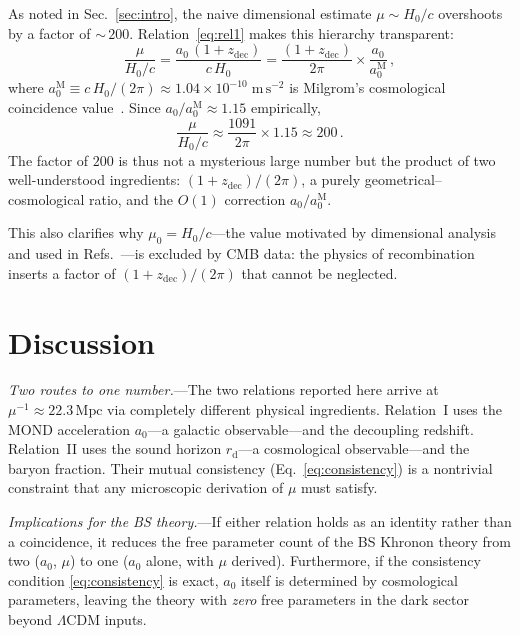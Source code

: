 \documentclass[prl,twocolumn,superscriptaddress,longbibliography]{revtex4-2}
\newcommand{\Mpc}{\,\mathrm{Mpc}}
\newcommand{\zdec}{z_{\mathrm{dec}}}
\newcommand{\rd}{r_{\mathrm{d}}}
\begin{document}
As noted in Sec.~\ref{sec:intro}, the naive dimensional
estimate $\mu \sim H_0/c$ overshoots by a factor
of ${\sim}\,200$.
Relation~\eqref{eq:rel1} makes this hierarchy transparent:
\begin{equation}
  \frac{\mu}{H_0/c}
  = \frac{a_0\,(1 + \zdec)}{c\, H_0}
  = \frac{(1 + \zdec)}{2\pi}
    \times \frac{a_0}{a_0^{\mathrm{M}}} \,,
  \label{eq:hierarchy}
\end{equation}
where $a_0^{\mathrm{M}} \equiv c\, H_0 / (2\pi)
\approx 1.04 \times 10^{-10}\;\mathrm{m\,s}^{-2}$ is
Milgrom's cosmological coincidence
value~\cite{Milgrom1983,Milgrom2020}.
Since $a_0 / a_0^{\mathrm{M}} \approx 1.15$ empirically,
\begin{equation}
  \frac{\mu}{H_0/c}
  \approx \frac{1091}{2\pi} \times 1.15
  \approx 200 \,.
  \label{eq:200}
\end{equation}
The factor of $200$ is thus not a mysterious large
number but the product of two well-understood
ingredients: $(1 + \zdec)/(2\pi)$, a purely
geometrical--cosmological ratio, and the
$O(1)$ correction $a_0/a_0^{\mathrm{M}}$.

This also clarifies why $\mu_0 = H_0/c$---the
value motivated by dimensional analysis and used
in Refs.~\cite{Huang2026_P3,Huang2026_P4}---is
excluded by CMB data: the physics of recombination
inserts a factor of $(1 + \zdec)/(2\pi)$ that
cannot be neglected.


\section{Discussion}
\label{sec:discussion}

\emph{Two routes to one number.}---The
two relations reported here arrive at
$\mu^{-1} \approx 22.3\Mpc$ via completely
different physical ingredients.
Relation~I uses the MOND acceleration $a_0$---a
galactic observable---and the decoupling redshift.
Relation~II uses the sound horizon $\rd$---a
cosmological observable---and the baryon fraction.
Their mutual consistency (Eq.~\eqref{eq:consistency})
is a nontrivial constraint that any microscopic
derivation of $\mu$ must satisfy.

\emph{Implications for the BS theory.}---If
either relation holds as an identity rather than a
coincidence, it reduces the free parameter count
of the BS Khronon theory from two ($a_0$, $\mu$) to
one ($a_0$ alone, with $\mu$ derived).
Furthermore, if the consistency condition
\eqref{eq:consistency} is exact,
$a_0$ itself is determined by cosmological
parameters, leaving the theory with
\emph{zero} free parameters in the dark sector
beyond $\Lambda$CDM inputs.
\end{document}
